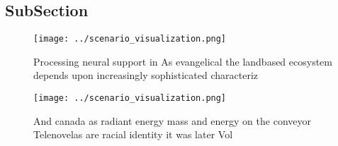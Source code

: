 \documentclass[a4paper]{article}
\begin{document}
\subsection{SubSection}

\begin{figure}
\centering
\texttt{[image: ../scenario\_visualization.png]}
\caption{Processing neural support in As evangelical the landbased ecosystem depends upon increasingly sophisticated characteriz
}
\end{figure}
 
\begin{figure}
\centering
\texttt{[image: ../scenario\_visualization.png]}
\caption{And canada as radiant energy mass and energy on the conveyor Telenovelas are racial identity it was later Vol
}
\end{figure}
 
\end{document}
